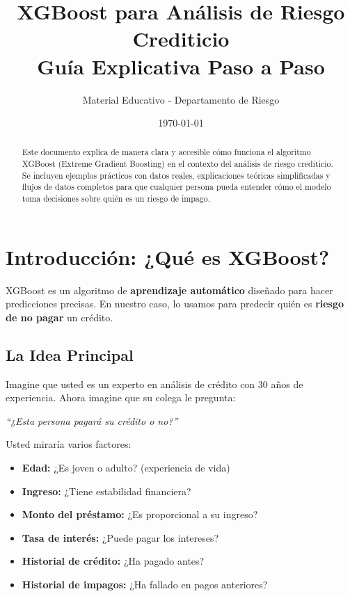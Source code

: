 \documentclass[11pt,a4paper,spanish]{article}
\title{\textbf{XGBoost para Análisis de Riesgo Crediticio} \\ {\large Guía Explicativa Paso a Paso}}
\author{Material Educativo - Departamento de Riesgo}
\date{\today}
\begin{document}
\maketitle

\begin{abstract}
Este documento explica de manera clara y accesible cómo funciona el algoritmo XGBoost (Extreme Gradient Boosting) en el contexto del análisis de riesgo crediticio. Se incluyen ejemplos prácticos con datos reales, explicaciones teóricas simplificadas y flujos de datos completos para que cualquier persona pueda entender cómo el modelo toma decisiones sobre quién es un riesgo de impago.
\end{abstract}

\tableofcontents
\newpage

\section{Introducción: ¿Qué es XGBoost?}

XGBoost es un algoritmo de \textbf{aprendizaje automático} diseñado para hacer predicciones precisas. En nuestro caso, lo usamos para predecir quién es \textbf{riesgo de no pagar} un crédito.

\subsection{La Idea Principal}

Imagine que usted es un experto en análisis de crédito con 30 años de experiencia. Ahora imagine que su colega le pregunta:

\begin{center}
\textit{``¿Esta persona pagará su crédito o no?''}
\end{center}

Usted miraría varios factores:
\begin{itemize}
    \item \textbf{Edad:} ¿Es joven o adulto? (experiencia de vida)
    \item \textbf{Ingreso:} ¿Tiene estabilidad financiera?
    \item \textbf{Monto del préstamo:} ¿Es proporcional a su ingreso?
    \item \textbf{Tasa de interés:} ¿Puede pagar los intereses?
    \item \textbf{Historial de crédito:} ¿Ha pagado antes?
    \item \textbf{Historial de impagos:} ¿Ha fallado en pagos anteriores?
\end{itemize}
\end{document}
